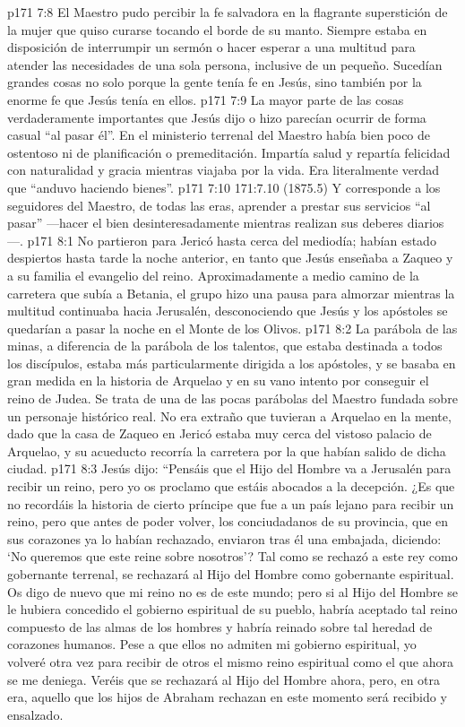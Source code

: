 \vs p171 7:8 El Maestro pudo percibir la fe salvadora en la flagrante superstición de la mujer que quiso curarse tocando el borde de su manto. Siempre estaba en disposición de interrumpir un sermón o hacer esperar a una multitud para atender las necesidades de una sola persona, inclusive de un pequeño. Sucedían grandes cosas no solo porque la gente tenía fe en Jesús, sino también por la enorme fe que Jesús tenía en ellos.
\vs p171 7:9 La mayor parte de las cosas verdaderamente importantes que Jesús dijo o hizo parecían ocurrir de forma casual “al pasar él”. En el ministerio terrenal del Maestro había bien poco de ostentoso ni de planificación o premeditación. Impartía salud y repartía felicidad con naturalidad y gracia mientras viajaba por la vida. Era literalmente verdad que “anduvo haciendo bienes”.
\vs p171 7:10 171:7.10 (1875.5) Y corresponde a los seguidores del Maestro, de todas las eras, aprender a prestar sus servicios “al pasar” ---hacer el bien desinteresadamente mientras realizan sus deberes diarios---.
\vs p171 8:1 No partieron para Jericó hasta cerca del mediodía; habían estado despiertos hasta tarde la noche anterior, en tanto que Jesús enseñaba a Zaqueo y a su familia el evangelio del reino. Aproximadamente a medio camino de la carretera que subía a Betania, el grupo hizo una pausa para almorzar mientras la multitud continuaba hacia Jerusalén, desconociendo que Jesús y los apóstoles se quedarían a pasar la noche en el Monte de los Olivos.
\vs p171 8:2 La parábola de las minas, a diferencia de la parábola de los talentos, que estaba destinada a todos los discípulos, estaba más particularmente dirigida a los apóstoles, y se basaba en gran medida en la historia de Arquelao y en su vano intento por conseguir el reino de Judea. Se trata de una de las pocas parábolas del Maestro fundada sobre un personaje histórico real. No era extraño que tuvieran a Arquelao en la mente, dado que la casa de Zaqueo en Jericó estaba muy cerca del vistoso palacio de Arquelao, y su acueducto recorría la carretera por la que habían salido de dicha ciudad.
\vs p171 8:3 \pc Jesús dijo: “Pensáis que el Hijo del Hombre va a Jerusalén para recibir un reino, pero yo os proclamo que estáis abocados a la decepción. ¿Es que no recordáis la historia de cierto príncipe que fue a un país lejano para recibir un reino, pero que antes de poder volver, los conciudadanos de su provincia, que en sus corazones ya lo habían rechazado, enviaron tras él una embajada, diciendo: ‘No queremos que este reine sobre nosotros’? Tal como se rechazó a este rey como gobernante terrenal, se rechazará al Hijo del Hombre como gobernante espiritual. Os digo de nuevo que mi reino no es de este mundo; pero si al Hijo del Hombre se le hubiera concedido el gobierno espiritual de su pueblo, habría aceptado tal reino compuesto de las almas de los hombres y habría reinado sobre tal heredad de corazones humanos. Pese a que ellos no admiten mi gobierno espiritual, yo volveré otra vez para recibir de otros el mismo reino espiritual como el que ahora se me deniega. Veréis que se rechazará al Hijo del Hombre ahora, pero, en otra era, aquello que los hijos de Abraham rechazan en este momento será recibido y ensalzado.
